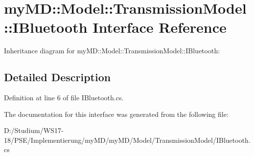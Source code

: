 \hypertarget{interfacemy_m_d_1_1_model_1_1_transmission_model_1_1_i_bluetooth}{
\section{my\-MD::Model::Transmission\-Model::IBluetooth Interface Reference}
\label{d6/d1c/interfacemy_m_d_1_1_model_1_1_transmission_model_1_1_i_bluetooth}
}
Inheritance diagram for my\-MD::Model::Transmission\-Model::IBluetooth:

\subsection{Detailed Description}




Definition at line 6 of file IBluetooth.cs.

The documentation for this interface was generated from the following file:\begin{CompactItemize}
\item 
D:/Studium/WS17-18/PSE/Implementierung/my\-MD/my\-MD/Model/Transmission\-Model/IBluetooth.cs\end{CompactItemize}
